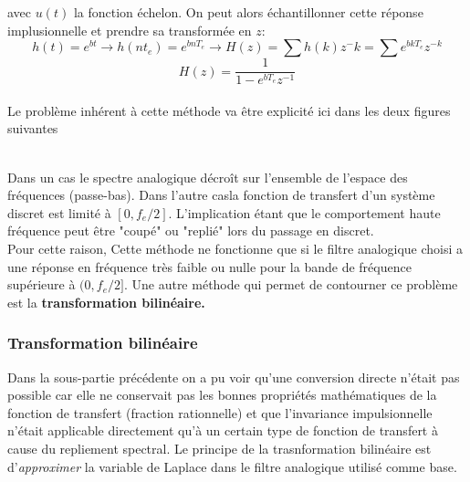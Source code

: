\documentclass[11pt,a4paper]{article}
\begin{document}
avec $u(t)$ la fonction échelon. On peut alors échantillonner cette réponse implusionnelle et prendre sa transformée en $z$:\\

\[ h(t) = e^{bt} \rightarrow h(nt_e) = e^{bnT_e} \rightarrow H(z) = \sum h(k)z^-k =  \sum e^{bkT_e} z^{-k}\]
\[ H(z) = \frac{1}{1 -  e^{bT_e} z^{-1}}\]\\

Le problème inhérent à cette méthode va être explicité ici dans les deux figures suivantes

\\

Dans un cas le  spectre analogique décroît sur l'ensemble de l'espace des fréquences (passe-bas). Dans l'autre casla fonction de transfert d'un système discret  est limité à $[0, f_e/2]$. L'implication étant que le comportement haute fréquence peut être "coupé" ou "replié" lors du passage en discret.\\

Pour cette raison, Cette méthode ne fonctionne que si le filtre analogique choisi a une réponse en fréquence très faible ou nulle pour la bande de fréquence supérieure à $(0, f_e/2]$. Une autre méthode qui permet de contourner ce problème est la \textbf{transformation bilinéaire.}

\subsubsection{Transformation bilinéaire}
Dans la sous-partie précédente on a pu voir qu'une conversion directe n'était pas possible car elle ne conservait pas les bonnes propriétés mathématiques de la fonction de transfert (fraction rationnelle) et que l'invariance impulsionnelle n'était applicable directement qu'à un certain type de fonction de transfert à cause du repliement spectral. Le principe de la trasnformation bilinéaire est d'\textit{approximer} la variable de Laplace dans le filtre analogique utilisé comme base.\\
\end{document}
